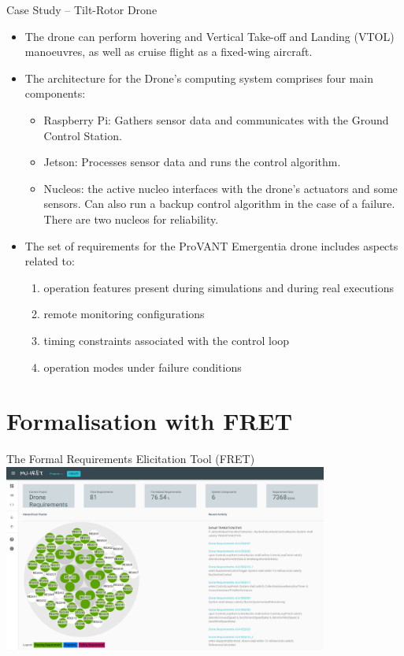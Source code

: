 \documentclass[11pt, aspectratio=169, table]{beamer}
\begin{document}
\begin{frame}{Case Study -- Tilt-Rotor Drone}
\begin{block}{}
	\begin{itemize}
		\item The drone can perform hovering and Vertical Take-off and Landing (VTOL) manoeuvres, as well as cruise flight as a fixed-wing aircraft.
		
		\item The architecture for the Drone's computing system comprises four main components:
		\begin{itemize}
		\item Raspberry Pi: Gathers sensor data and communicates with the Ground Control Station.
			\item Jetson: Processes sensor data and runs the control algorithm.
			\item Nucleos: the active nucleo interfaces with the drone's actuators and some sensors. Can also run a backup control algorithm in the case of a failure. There are two nucleos for reliability.
		\end{itemize}
		
		\item The set of requirements for the ProVANT Emergentia drone includes aspects related to:
		\begin{enumerate}
			\item operation features present during simulations and during real executions
			\item remote monitoring configurations
			\item timing constraints associated with the control loop
			\item operation modes under failure conditions
		\end{enumerate}
	\end{itemize}
\end{block}
\end{frame}

\section{Formalisation with FRET}

\begin{frame}{The Formal Requirements Elicitation Tool (FRET)}
\centering
\includegraphics[width=0.8\textwidth]{images/mu-fret-dashboard.png}
\end{frame}
\end{document}
